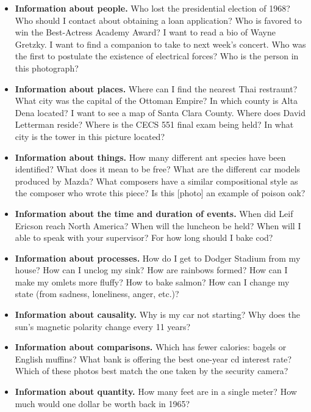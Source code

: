 \documentclass [12pt]{article}
\begin{document}
\begin{itemize}
\item \textbf{Information about people.} Who lost the presidential election of 1968? Who should I contact about obtaining a 
loan application? Who is favored to win the Best-Actress Academy Award? I want to read a bio of Wayne Gretzky. 
I want to find a companion to take to next week's concert. Who was the first to postulate the existence of electrical 
forces? Who is the person in this photograph?

\item \textbf{Information about places.} Where can I find the nearest Thai restraunt? What city was the capital of the 
Ottoman Empire? In which county is Alta Dena located? I want to see a map of Santa Clara County. Where does David
Letterman reside? Where is the CECS 551 final exam being held? In what city is the tower in this picture located?

\item \textbf{Information about things.} How many different ant species have been identified?
What does it mean to be free? What are the different car models produced by Mazda? What composers have a similar
compositional style as the composer who wrote this piece? Is this [photo] an example of poison oak?

\item \textbf{Information about the time and duration of events.} When did Leif Ericson reach North America? When will the luncheon be
held? When will I able to speak with your supervisor? For how long should I bake cod?

\item \textbf{Information about processes.} How do I get to Dodger Stadium from my house? How can I unclog my sink?
How are rainbows formed? How can I make my omlets more fluffy? How to bake salmon? How can I change my state (from
sadness, loneliness, anger, etc.)?

\item \textbf{Information about causality.} Why is my car not starting? Why does the sun's magnetic polarity change
every 11 years?

\item \textbf{Information about comparisons.} Which has fewer calories: bagels or English muffins? What bank is offering
the best one-year cd interest rate? Which of these photos best match the one taken by the security camera?

\item \textbf{Information about quantity.} How many feet are in a single meter? How much would one dollar be worth
back in 1965?
\end{itemize}
\end{document}
